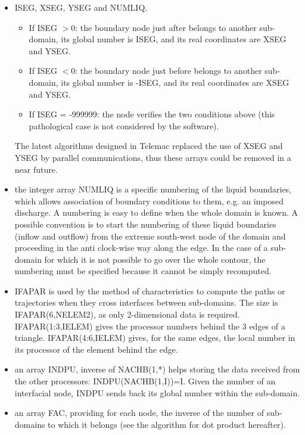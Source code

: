 \begin{itemize}
  \item ISEG, XSEG, YSEG and NUMLIQ.
    \begin{itemize}
      \item If ISEG $>$0: the boundary node just after belongs to another
        sub-domain, its global number is ISEG, and its real coordinates are
        XSEG and YSEG.
      \item If ISEG $<$0: the boundary node just before belongs to another
        sub-domain, its global number is -ISEG, and its real coordinates are
        XSEG and YSEG.
      \item If ISEG = -999999: the node verifies the two conditions above (this
        pathological case is not considered by the software).
    \end{itemize}
    The latest algorithms designed in Telemac replaced the use of XSEG and YSEG
    by parallel communications, thus these arrays could be removed in a near
    future.
\item the integer array NUMLIQ is a specific numbering of the liquid
  boundaries, which allows association of boundary conditions to them, e.g. an
  imposed discharge. A numbering is easy to define when the whole domain is
  known. A possible convention is to start the numbering of these liquid
  boundaries (inflow and outflow) from the extreme south-west node of the
  domain and proceeding in the anti clock-wise way along the edge. In the case
  of a sub-domain for which it is not possible to go over the whole contour,
  the numbering must be specified because it cannot be simply recomputed.

\item IFAPAR is used by the method of characteristics to compute the
  paths or trajectories when they cross interfaces between sub-domains. The
  size is IFAPAR(6,NELEM2), as only 2-dimensional data is required.
  IFAPAR(1:3,IELEM) gives the processor numbers behind the 3 edges of a
  triangle. IFAPAR(4:6,IELEM) gives, for the same edges, the local number in
  its processor of the element behind the edge.

\item an array INDPU, inverse of NACHB(1,*) helps storing the data
  received from the other processors: INDPU(NACHB(1,I))=I. Given the number of
  an interfacial node, INDPU sends back its global number within the
  sub-domain.

\item an array FAC, providing for each node, the inverse of the number
  of sub-domains to which it belongs (see the algorithm for dot product
  hereafter).
\end{itemize}

